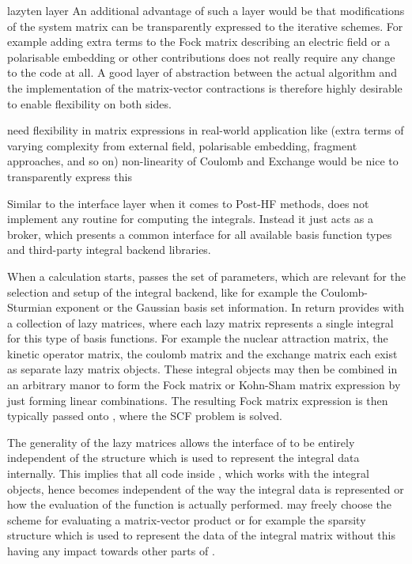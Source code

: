 lazyten layer
An additional advantage of such a layer would be that
modifications of the system matrix can be transparently expressed
to the iterative schemes.
For example adding extra terms to the Fock matrix
describing an electric field or a polarisable embedding
or other contributions does not really require
any change to the \SCF code at all.
A good layer of abstraction between the actual \SCF algorithm
and the implementation of the matrix-vector contractions
is therefore highly desirable to enable flexibility on both sides.

need flexibility in matrix expressions in real-world application
like \SCF (extra terms of varying complexity from external field,
polarisable embedding, fragment approaches, and so on)
non-linearity of Coulomb and Exchange
would be nice to transparently express this



Similar to the \molsturm interface layer when it comes to Post-HF methods,
\gint does not implement any routine for computing the integrals.
Instead it just acts as a broker,
which presents a common interface for all available basis function types
and third-party integral backend libraries.

When a calculation starts,
\molsturm passes \gint the set of parameters,
which are relevant for the selection and setup of the integral backend,
like for example the Coulomb-Sturmian exponent or the Gaussian basis set information.
In return \gint provides \molsturm with a collection of lazy matrices,
where each lazy matrix represents a single integral for this
type of basis functions.
For example the nuclear attraction matrix, the kinetic operator matrix,
the coulomb matrix and the exchange matrix each exist as separate
lazy matrix objects.
These integral objects may then be combined
in an arbitrary manor to form the Fock matrix or Kohn-Sham matrix
expression by just forming linear combinations.
The resulting Fock matrix expression is then typically passed onto \gscf,
where the SCF problem is solved.

The generality of the lazy matrices allows the interface of \gint
to be entirely independent of the structure
which is used to represent the integral data internally.
This implies that all code inside \molsturm,
which works with the integral objects,
hence becomes independent of the way the integral data is represented
or how the evaluation of the \contraction function is actually performed.
\gint may freely choose the scheme for evaluating a matrix-vector
product or for example the sparsity structure which is used to
represent the data of the integral matrix
without this having any impact towards other parts of \molsturm.

